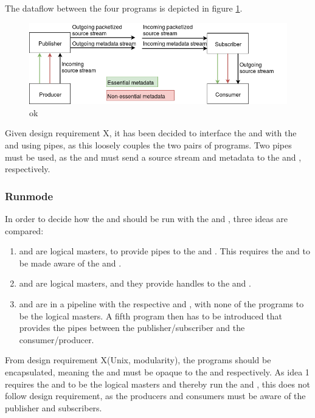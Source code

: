 The dataflow between the four programs is depicted in figure \ref{fig:design:pubsub}.
\begin{figure}[H]
	\centering
	\includegraphics[width=1\textwidth]{figures/publisher-subscriber}
	\caption{ok} \label{fig:design:pubsub}
\end{figure}


Given design requirement X, it has been decided to interface the \pubs{} and \subs{} with the \pros{} and \cons{} using pipes, as this loosely couples the two pairs of programs. Two pipes must be used, as the \pros{} and \subs{} must send a source stream and metadata to the \pubs{} and \cons, respectively.

\subsubsection*{Runmode}
In order to decide how the \pubs{} and \subs{} should be run with the \pros{} and \cons{}, three ideas are compared:
\begin{enumerate}
	\item \cons{} and \pros{} are logical masters, to provide pipes to the \pubs{} and \subs{}. This requires the \cons{} and \pros{} to be made aware of the \subs{} and \pubs{}. 
	\item \subs{} and \pubs{} are logical masters, and they provide handles to the \cons{} and \subs{}.
	\item \subs{} and \pubs{} are in a pipeline with the respective \cons{} and \pros{}, with none of the programs to be the logical masters. A fifth program then has to be introduced that provides the pipes between the publisher/subscriber and the consumer/producer.
\end{enumerate}

From design requirement X(Unix, modularity), the programs should be encapsulated, meaning the \pubs{} and \subs{} must be opaque to the \cons{} and \pros{} respectively. As idea 1 requires the \cons{} and \pros{} to be the logical masters and thereby run the \pubs{} and \subs{}, this does not follow design requirement, as the producers and consumers must be aware of the publisher and subscribers.

